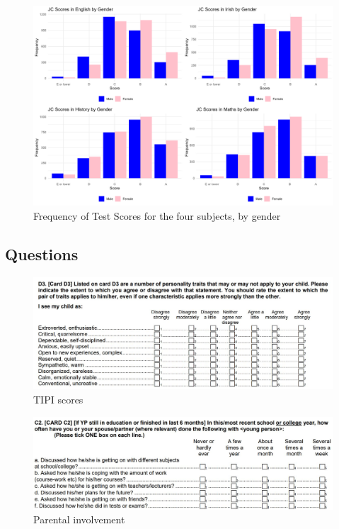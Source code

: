 \documentclass[a4paper]{article}
\begin{document}
\begin{figure}[htbp] 
    \centering
    \includegraphics[width=1\linewidth]{Frequency of Test Scores by Gender side by side.jpeg}
    \caption{Frequency of Test Scores for the four subjects, by gender}
    \label{}
\end{figure}

\clearpage
\subsection{Questions}
\begin{figure}[htbp] 
    \centering
    \includegraphics[width=1\linewidth]{TIPI_PCG.JPG}
    \caption{TIPI scores}
    \label{}
\end{figure}

\begin{figure}[htbp] 
    \centering
    \includegraphics[width=1\linewidth]{PI.JPG}
    \caption{Parental involvement}
    \label{}
\end{figure}
\end{document}
